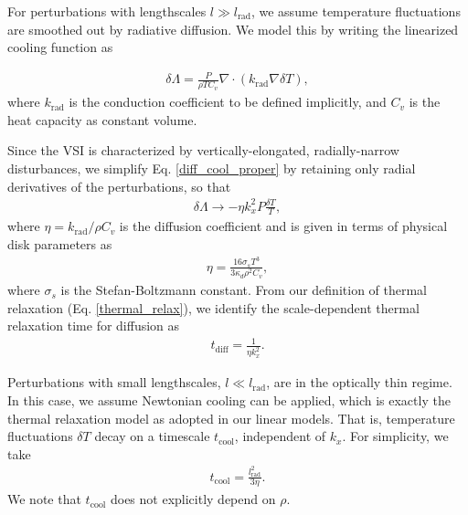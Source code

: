 For perturbations with lengthscales $l\gg l_\mathrm{rad}$, we assume
temperature fluctuations are smoothed out by radiative diffusion. We 
model this by writing the linearized cooling function as 

\begin{align}\label{diff_cool_proper}
  \delta \Lambda = \frac{P}{\rho T C_v} \nabla\cdot\left(k_\mathrm{rad}\nabla\delta
    T\right),  
\end{align}
where $k_\mathrm{rad}$ is the conduction coefficient to be defined
implicitly, and $C_v$ is the heat capacity as constant volume. 


Since the VSI is characterized by vertically-elongated,
radially-narrow disturbances, we simplify Eq. \ref{diff_cool_proper} 
by retaining only radial derivatives of the perturbations, so that 
\begin{align}\label{diff_cool_approx}
  \delta\Lambda \to %
  -\eta k_x^2 P \frac{\delta T}{T}, %
\end{align}
 where $\eta=k_\mathrm{rad}/\rho C_v$ is
the diffusion coefficient and 
is given in terms of physical disk parameters as 
\begin{align}\label{eta_def}
  \eta = \frac{16\sigma_s T^3}{3\kappa_d\rho^2 C_v}, 
\end{align}
where $\sigma_s$ is the Stefan-Boltzmann constant. From our
definition of thermal relaxation (Eq. \ref{thermal_relax}), 
we identify the scale-dependent thermal relaxation
time for diffusion as 
\begin{align}\label{tc_diff_cool} 
  t_\mathrm{diff} = \frac{1}{\eta k_x^2}.%
\end{align}

Perturbations with small lengthscales, $l\ll 
l_\mathrm{rad}$, are in the optically thin regime. In this case, we assume 
Newtonian cooling can be applied, which is exactly the thermal 
relaxation model as adopted in our linear models. That is, temperature
fluctuations $\delta T$ decay on a timescale $t_\mathrm{cool}$,
independent of $k_x$. For simplicity, we take  
\begin{align}
  t_\mathrm{cool} = \frac{l_\mathrm{rad}^2}{3\eta}. 
\end{align}
We note that $t_\mathrm{cool}$ does not explicitly depend on $\rho$. 

